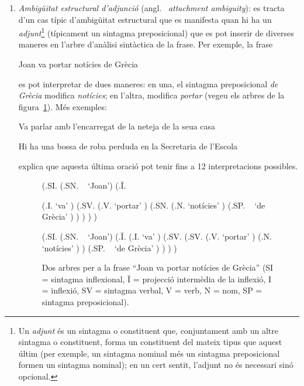 \begin{enumerate}
  
\item \emph{Ambigüitat estructural d'adjunció} (angl.\ {\em
    attachment ambiguity}): es tracta d'un cas típic
  d'ambigüitat estructural que es manifesta quan hi ha un {\em
    adjunt}\footnote{Un \emph{adjunt} és un sintagma o constituent que,
    conjuntament amb un altre sintagma o constituent, forma un constituent del
    mateix tipus que aquest últim (per exemple, un sintagma nominal
    més un sintagma preposicional formen un sintagma nominal); en un cert sentit, l'adjunt no és
    necessari sinó opcional.} (típicament un sintagma preposicional) que es pot
  inserir de diverses maneres en l'arbre d'anàlisi sintàctica de la
  frase.  Per exemple, la frase
  \begin{exemple}
    Joan va portar notícies de Grècia
  \end{exemple} 
  es pot interpretar de dues maneres: en una, el sintagma
  preposicional \emph{de Grècia} modifica \emph{notícies}; en l'altra,
  modifica \emph{portar} (vegeu els arbres de la
  figura~\ref{fg:noticies}).  Més exemples:
  \begin{exemple}
  Va parlar amb l'encarregat de la neteja de la seua casa
  \end{exemple}
  \begin{exemple}
  Hi ha una bossa de
  roba perduda en la Secretaria de l'Escola
  \label{ex:bossa}
  \end{exemple}
  \citet{tuson99b} explica que aquesta última oració pot tenir fins a 12
  interpretacions possibles.

\begin{figure}
\begin{center}
\begin{parsetree}
(.SI. (.SN. ~ `Joan')
      (.{\={I}}. 

          (.I. `va' ) 
          (.SV. 
                (.V. `portar' )
                (.SN. 
                     (.N. `notícies' ) 
                     (.SP. ~ `de Grècia' )
                )
          ) 
      ) 
) 
\end{parsetree}
\end{center}
\begin{center}
\begin{parsetree}
(.SI. (.SN. ~ `Joan') (.{\={I}}. (.I. `va' ) (.SV. (.SV. (.V. `portar' )
(.N. `notícies' ) )  (.SP. ~ `de Grècia' ) ) ) )
\end{parsetree}
\end{center}
\caption{Dos arbres per a la frase ``Joan va portar notícies de
  Grècia'' (SI = sintagma inflexional, \={I} = projecció intermèdia de
  la inflexió, I = inflexió, SV = sintagma verbal, V = verb, N = nom,
  SP = sintagma preposicional). }
\label{fg:noticies}
\end{figure}


\end{enumerate}
